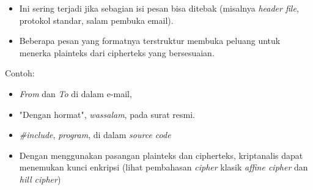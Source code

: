 \documentclass{article}
\begin{document}

\begin{itemize}
    \item Ini sering terjadi jika sebagian isi pesan bisa ditebak (misalnya \textit{header file}, protokol standar, salam pembuka email).
    \item Beberapa pesan yang formatnya terstruktur membuka peluang untuk menerka plainteks dari cipherteks yang bersesuaian.
\end{itemize}

Contoh:

\begin{itemize}
    \item \textit{From} dan \textit{To} di dalam e-mail,
    \item "Dengan hormat", \textit{wassalam}, pada surat resmi.
    \item \textit{\#include}, \textit{program}, di dalam \textit{source code}
\end{itemize}

\vspace{10mm}

\begin{itemize}
    \item Dengan menggunakan pasangan plainteks dan cipherteks, kriptanalis dapat menemukan kunci enkripsi (lihat pembahasan \textit{cipher} klasik \textit{affine cipher} dan \textit{hill cipher})
\end{itemize}
\end{document}
